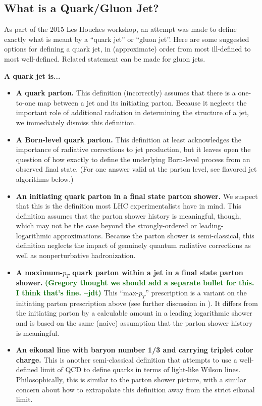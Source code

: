\documentclass[11pt]{cernrep}
\newcommand{\jdt}[1]{\textbf{\textcolor{darkgreen}{(#1 --jdt)}}}
\begin{document}
\subsection{What is a Quark/Gluon Jet?}
\label{quarkgluon_sec:def}

As part of the 2015 Les Houches workshop, an attempt was made to
define exactly what is meant by a ``quark jet'' or ``gluon jet''.
Here are some suggested options for defining a quark jet, in
(approximate) order from most ill-defined to most well-defined.
Related statement can be made for gluon jets.

\noindent \textbf{A quark jet is...}
\begin{itemize}
\item \textbf{A quark parton.}  This definition (incorrectly) assumes that there is a one-to-one map between a jet and its initiating parton.  Because it neglects the important role of additional radiation in determining the structure of a jet, we immediately dismiss this definition.
\item \textbf{A Born-level quark parton.}  This definition at least acknowledges the importance of radiative corrections to jet production, but it leaves open the question of how exactly to define the underlying Born-level process from an observed final state.  (For one answer valid at the parton level, see flavored jet algorithms below.)
\item \textbf{An initiating quark parton in a final state parton
    shower.}  We suspect that this is the definition most LHC
  experimentalists have in mind.  This definition assumes that the parton shower history is meaningful, though,
  which may not be the case beyond the strongly-ordered or
  leading-logarithmic approximations.  Because the parton shower is
  semi-classical, this definition neglects the impact of genuinely
  quantum radiative corrections as well as nonperturbative
  hadronization.
\item \textbf{A maximum-$p_T$ quark parton within a jet in a final state parton shower.}  \jdt{Gregory thought we should add a separate bullet for this.  I think that's fine.}  This ``max-$p_T$'' prescription is a variant on the initiating parton prescription above (see further discussion in \cite{Buckley:2015gua}).  It differs from the initiating parton by a calculable amount in a leading logarithmic shower \cite{Dasgupta:2014yra} and is based on the same (naive) assumption that the parton shower history is meaningful. 
\item \textbf{An eikonal line with baryon number 1/3 and carrying triplet color charge.}  This is another semi-classical definition that attempts to use a well-defined limit of QCD to define quarks in terms of light-like Wilson lines.  Philosophically, this is similar to the parton shower picture, with a similar concern about how to extrapolate this definition away from the strict eikonal limit.

\end{itemize}
\end{document}
